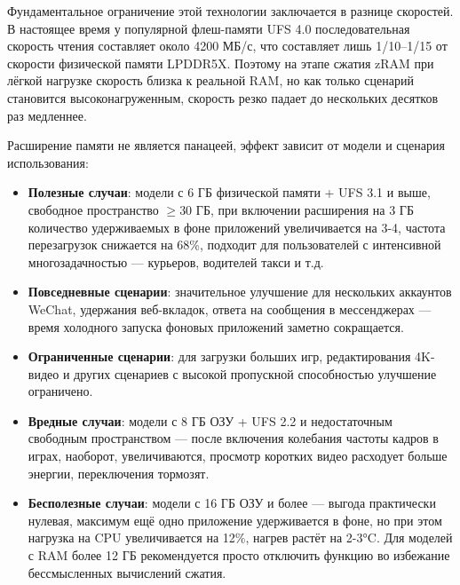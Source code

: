 
Фундаментальное ограничение этой технологии заключается в разнице скоростей. В настоящее время у популярной флеш-памяти UFS 4.0 последовательная скорость чтения составляет около 4200 МБ/с, что составляет лишь 1/10–1/15 от скорости физической памяти LPDDR5X. Поэтому на этапе сжатия zRAM при лёгкой нагрузке скорость близка к реальной RAM, но как только сценарий становится высоконагруженным, скорость резко падает до нескольких десятков раз медленнее.


Расширение памяти не является панацеей, эффект зависит от модели и сценария использования:

\begin{itemize}
  \item \textbf{Полезные случаи}: модели с 6 ГБ физической памяти + UFS 3.1 и выше, свободное пространство $\geq$30 ГБ, при включении расширения на 3 ГБ количество удерживаемых в фоне приложений увеличивается на 3-4, частота перезагрузок снижается на 68\%, подходит для пользователей с интенсивной многозадачностью — курьеров, водителей такси и т.д.
  \item \textbf{Повседневные сценарии}: значительное улучшение для нескольких аккаунтов WeChat, удержания веб-вкладок, ответа на сообщения в мессенджерах — время холодного запуска фоновых приложений заметно сокращается.
  \item \textbf{Ограниченные сценарии}: для загрузки больших игр, редактирования 4K-видео и других сценариев с высокой пропускной способностью улучшение ограничено.
  \item \textbf{Вредные случаи}: модели с 8 ГБ ОЗУ + UFS 2.2 и недостаточным свободным пространством — после включения колебания частоты кадров в играх, наоборот, увеличиваются, просмотр коротких видео расходует больше энергии, переключения тормозят.
  \item \textbf{Бесполезные случаи}: модели с 16 ГБ ОЗУ и более — выгода практически нулевая, максимум ещё одно приложение удерживается в фоне, но при этом нагрузка на CPU увеличивается на 12\%, нагрев растёт на 2-3°C. Для моделей с RAM более 12 ГБ рекомендуется просто отключить функцию во избежание бессмысленных вычислений сжатия.
\end{itemize}


